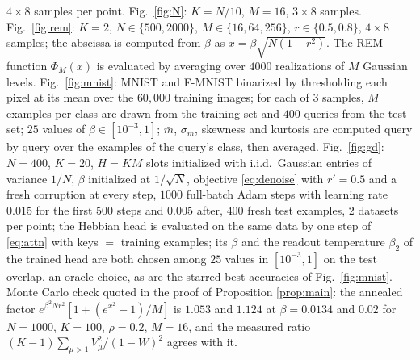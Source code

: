 \documentclass{SciPost}
\theoremstyle{plain}
\theoremstyle{definition}
\begin{document}
\begin{appendix}
$4\times8$ samples per point. Fig.\ \ref{fig:N}: $K=N/10$, $M=16$, $3\times8$ samples. Fig.\ \ref{fig:rem}: $K=2$, $N\in\{500,2000\}$, $M\in\{16,64,256\}$, $r\in\{0.5,0.8\}$, $4\times8$ samples; the abscissa is computed from $\beta$ as $x=\beta\sqrt{N(1-r^2)}$. The REM function $\Phi_M(x)$ is evaluated by averaging over $4000$ realizations of $M$ Gaussian levels. Fig.\ \ref{fig:mnist}: MNIST and F-MNIST binarized by thresholding each pixel at its mean over the $60{,}000$ training images; for each of $3$ samples, $M$ examples per class are drawn from the training set and $400$ queries from the test set; $25$ values of $\beta\in[10^{-3},1]$; $\bar m$, $\sigma_m$, skewness and kurtosis are computed query by query over the examples of the query's class, then averaged. Fig.\ \ref{fig:gd}: $N=400$, $K=20$, $H=KM$ slots initialized with i.i.d.\ Gaussian entries of variance $1/N$, $\beta$ initialized at $1/\sqrt N$, objective \eqref{eq:denoise} with $r'=0.5$ and a fresh corruption at every step, $1000$ full-batch Adam steps with learning rate $0.015$ for the first $500$ steps and $0.005$ after, $400$ fresh test examples, $2$ datasets per point; the Hebbian head is evaluated on the same data by one step of \eqref{eq:attn} with keys $=$ training examples; its $\beta$ and the readout temperature $\beta_2$ of the trained head are both chosen among $25$ values in $[10^{-3},1]$ on the test overlap, an oracle choice, as are the starred best accuracies of Fig.\ \ref{fig:mnist}. Monte Carlo check quoted in the proof of Proposition \ref{prop:main}: the annealed factor $e^{\beta^2Nr^2}[1+(e^{x^2}-1)/M]$ is $1.053$ and $1.124$ at $\beta=0.0134$ and $0.02$ for $N=1000$, $K=100$, $\rho=0.2$, $M=16$, and the measured ratio $(K-1)\sum_{\mu>1}V_\mu^2/(1-W)^2$ agrees with it.


\end{appendix}
\end{document}
